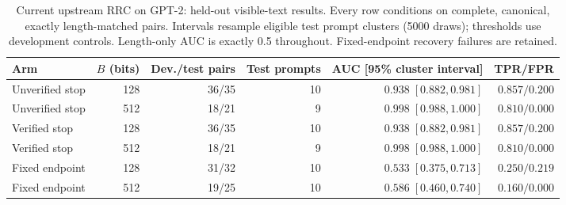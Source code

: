 \begin{table}[t]
\centering
\caption{Current upstream RRC on GPT-2: held-out visible-text results. Every row conditions on complete, canonical, exactly length-matched pairs. Intervals resample eligible test prompt clusters (5000 draws); thresholds use development controls. Length-only AUC is exactly 0.5 throughout. Fixed-endpoint recovery failures are retained.}
\label{tab:upstream-results}
\begin{tabular}{lrrrrr}
\toprule
Arm & $B$ (bits) & Dev./test pairs & Test prompts & AUC [95\% cluster interval] & TPR/FPR \\
\midrule
Unverified stop & 128 & 36/35 & 10 & $0.938\;[0.882,0.981]$ & $0.857/0.200$ \\
Unverified stop & 512 & 18/21 & 9 & $0.998\;[0.988,1.000]$ & $0.810/0.000$ \\
Verified stop & 128 & 36/35 & 10 & $0.938\;[0.882,0.981]$ & $0.857/0.200$ \\
Verified stop & 512 & 18/21 & 9 & $0.998\;[0.988,1.000]$ & $0.810/0.000$ \\
Fixed endpoint & 128 & 31/32 & 10 & $0.533\;[0.375,0.713]$ & $0.250/0.219$ \\
Fixed endpoint & 512 & 19/25 & 10 & $0.586\;[0.460,0.740]$ & $0.160/0.000$ \\
\bottomrule
\end{tabular}
\end{table}
